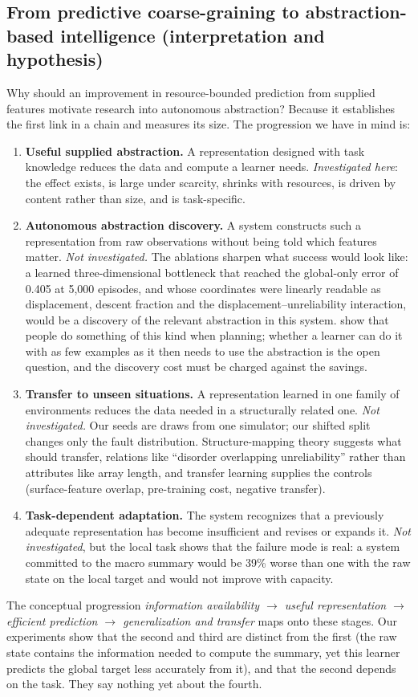 \documentclass[11pt,a4paper]{article}
\begin{document}
\subsection{From predictive coarse-graining to abstraction-based intelligence (interpretation and hypothesis)}
Why should an improvement in resource-bounded prediction from supplied features
motivate research into autonomous abstraction? Because it establishes the first
link in a chain and measures its size. The progression we have in mind is:
\begin{enumerate}[1.]
\item \textbf{Useful supplied abstraction.} A representation designed with
  task knowledge reduces the data and compute a learner needs.
  \emph{Investigated here}: the effect exists, is large under scarcity, shrinks
  with resources, is driven by content rather than size, and is task-specific.
\item \textbf{Autonomous abstraction discovery.} A system constructs such a
  representation from raw observations without being told which features
  matter. \emph{Not investigated.} The ablations sharpen what success would
  look like: a learned three-dimensional bottleneck that reached the
  global-only error of 0.405 at 5,000 episodes, and whose coordinates were
  linearly readable as displacement, descent fraction and the
  displacement--unreliability interaction, would be a discovery of the relevant
  abstraction in this system. \citet{ho2022} show that people do something of
  this kind when planning; whether a learner can do it with as few examples as
  it then needs to use the abstraction is the open question, and the discovery
  cost must be charged against the savings.
\item \textbf{Transfer to unseen situations.} A representation learned in one
  family of environments reduces the data needed in a structurally related
  one. \emph{Not investigated.} Our seeds are draws from one simulator; our
  shifted split changes only the fault distribution. Structure-mapping theory
  \citep{gentner1983} suggests what should transfer, relations like ``disorder
  overlapping unreliability'' rather than attributes like array length, and
  transfer learning \citep{pan2010} supplies the controls (surface-feature
  overlap, pre-training cost, negative transfer).
\item \textbf{Task-dependent adaptation.} The system recognizes that a
  previously adequate representation has become insufficient and revises or
  expands it. \emph{Not investigated}, but the local task shows that the
  failure mode is real: a system committed to the macro summary would be 39\%
  worse than one with the raw state on the local target and would not improve
  with capacity.
\end{enumerate}
The conceptual progression \emph{information availability $\to$ useful
representation $\to$ efficient prediction $\to$ generalization and transfer}
maps onto these stages. Our experiments show that the second and third are
distinct from the first (the raw state contains the information needed to compute the summary,
yet this learner predicts the global target less accurately from it), and that the second depends on the task. They say nothing yet about the
fourth.
\end{document}
